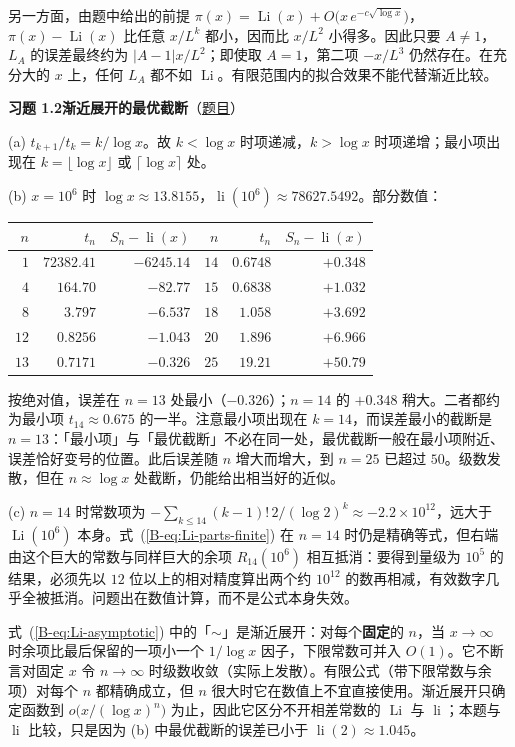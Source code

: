 \documentclass[11pt,a4paper]{article}
\DeclareMathOperator{\Li}{Li}
\DeclareMathOperator{\li}{li}
\newcommand{\bref}[1]{\ref*{B-#1}}
\newcommand{\Sol}[2]{%
  \par\addvspace{1.2em}\noindent
  \hypertarget{s:#1}{}\textbf{习题 #1\quad #2}\hfill{\small（\hyperlink{q:#1}{题目}）}\par
  \nopagebreak\smallskip}
\begin{document}
另一方面，由题中给出的前提 $\pi(x)=\Li(x)+O\bigl(x\,e^{-c\sqrt{\log x}}\bigr)$，$\pi(x)-\Li(x)$ 比任意 $x/L^k$ 都小，因而比 $x/L^2$ 小得多。因此只要 $A\ne1$，$L_A$ 的误差最终约为 $|A-1|x/L^2$；即使取 $A=1$，第二项 $-x/L^3$ 仍然存在。在充分大的 $x$ 上，任何 $L_A$ 都不如 $\Li$。有限范围内的拟合效果不能代替渐近比较。

\Sol{1.2}{渐近展开的最优截断}
(a) $t_{k+1}/t_k=k/\log x$。故 $k<\log x$ 时项递减，$k>\log x$ 时项递增；最小项出现在 $k=\lfloor\log x\rfloor$ 或 $\lceil\log x\rceil$ 处。

(b) $x=10^6$ 时 $\log x\approx13.8155$，$\li(10^6)\approx78627.5492$。部分数值：
\begin{center}
\begin{tabular}{rrr|rrr}
\toprule
$n$ & $t_n$ & $S_n-\li(x)$ & $n$ & $t_n$ & $S_n-\li(x)$\\
\midrule
$1$ & $72382.41$ & $-6245.14$ & $14$ & $0.6748$ & $+0.348$\\
$4$ & $164.70$ & $-82.77$ & $15$ & $0.6838$ & $+1.032$\\
$8$ & $3.797$ & $-6.537$ & $18$ & $1.058$ & $+3.692$\\
$12$ & $0.8256$ & $-1.043$ & $20$ & $1.896$ & $+6.966$\\
$13$ & $0.7171$ & $-0.326$ & $25$ & $19.21$ & $+50.79$\\
\bottomrule
\end{tabular}
\end{center}
按绝对值，误差在 $n=13$ 处最小（$-0.326$）；$n=14$ 的 $+0.348$ 稍大。二者都约为最小项 $t_{14}\approx0.675$ 的一半。注意最小项出现在 $k=14$，而误差最小的截断是 $n=13$：「最小项」与「最优截断」不必在同一处，最优截断一般在最小项附近、误差恰好变号的位置。此后误差随 $n$ 增大而增大，到 $n=25$ 已超过 $50$。级数发散，但在 $n\approx\log x$ 处截断，仍能给出相当好的近似。

(c) $n=14$ 时常数项为 $-\sum_{k\le14}(k-1)!\,2/(\log2)^k\approx-2.2\times10^{12}$，远大于 $\Li(10^6)$ 本身。式~(\bref{eq:Li-parts-finite}) 在 $n=14$ 时仍是精确等式，但右端由这个巨大的常数与同样巨大的余项 $R_{14}(10^6)$ 相互抵消：要得到量级为 $10^5$ 的结果，必须先以 $12$ 位以上的相对精度算出两个约 $10^{12}$ 的数再相减，有效数字几乎全被抵消。问题出在数值计算，而不是公式本身失效。

式~(\bref{eq:Li-asymptotic}) 中的「$\sim$」是渐近展开：对每个\textbf{固定}的 $n$，当 $x\to\infty$ 时余项比最后保留的一项小一个 $1/\log x$ 因子，下限常数可并入 $O(1)$。它不断言对固定 $x$ 令 $n\to\infty$ 时级数收敛（实际上发散）。有限公式（带下限常数与余项）对每个 $n$ 都精确成立，但 $n$ 很大时它在数值上不宜直接使用。渐近展开只确定函数到 $o\bigl(x/(\log x)^n\bigr)$ 为止，因此它区分不开相差常数的 $\Li$ 与 $\li$；本题与 $\li$ 比较，只是因为 (b) 中最优截断的误差已小于 $\li(2)\approx1.045$。
\end{document}
